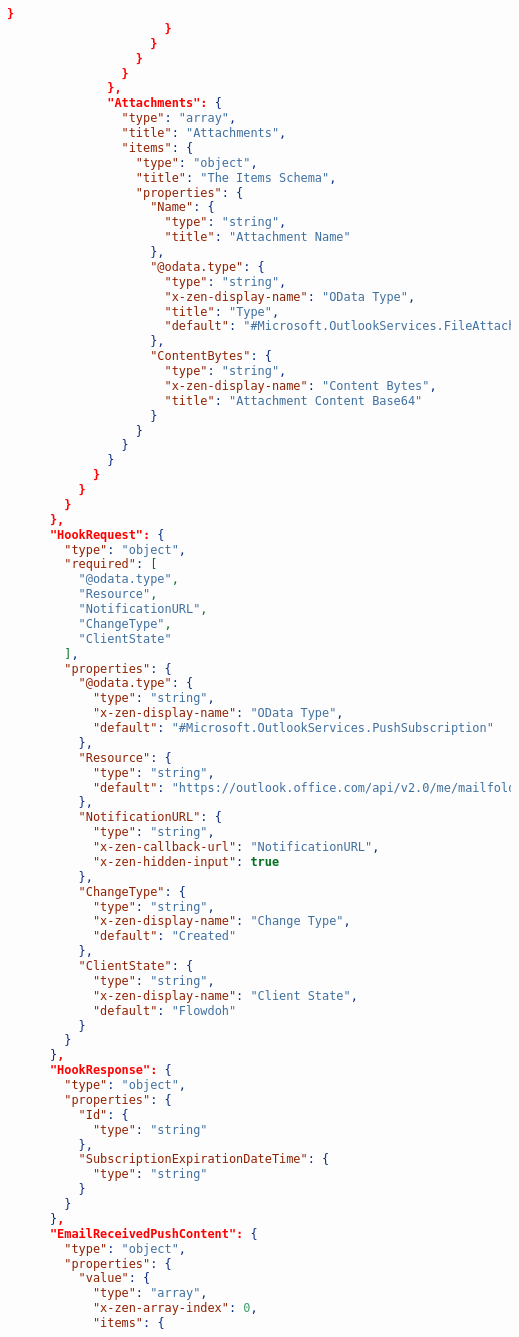 \begin{lstlisting}[language=json,basicstyle=\ttfamily\tiny,numberstyle=\tiny]
                        }
                      }
                    }
                  }
                }
              },
              "Attachments": {
                "type": "array",
                "title": "Attachments",
                "items": {
                  "type": "object",
                  "title": "The Items Schema",
                  "properties": {
                    "Name": {
                      "type": "string",
                      "title": "Attachment Name"
                    },
                    "@odata.type": {
                      "type": "string",
                      "x-zen-display-name": "OData Type",
                      "title": "Type",
                      "default": "#Microsoft.OutlookServices.FileAttachment"
                    },
                    "ContentBytes": {
                      "type": "string",
                      "x-zen-display-name": "Content Bytes",
                      "title": "Attachment Content Base64"
                    }
                  }
                }
              }
            }
          }
        }
      },
      "HookRequest": {
        "type": "object",
        "required": [
          "@odata.type",
          "Resource",
          "NotificationURL",
          "ChangeType",
          "ClientState"
        ],
        "properties": {
          "@odata.type": {
            "type": "string",
            "x-zen-display-name": "OData Type",
            "default": "#Microsoft.OutlookServices.PushSubscription"
          },
          "Resource": {
            "type": "string",
            "default": "https://outlook.office.com/api/v2.0/me/mailfolders('inbox')/messages"
          },
          "NotificationURL": {
            "type": "string",
            "x-zen-callback-url": "NotificationURL",
            "x-zen-hidden-input": true
          },
          "ChangeType": {
            "type": "string",
            "x-zen-display-name": "Change Type",
            "default": "Created"
          },
          "ClientState": {
            "type": "string",
            "x-zen-display-name": "Client State",
            "default": "Flowdoh"
          }
        }
      },
      "HookResponse": {
        "type": "object",
        "properties": {
          "Id": {
            "type": "string"
          },
          "SubscriptionExpirationDateTime": {
            "type": "string"
          }
        }
      },
      "EmailReceivedPushContent": {
        "type": "object",
        "properties": {
          "value": {
            "type": "array",
            "x-zen-array-index": 0,
            "items": {

\end{lstlisting}
